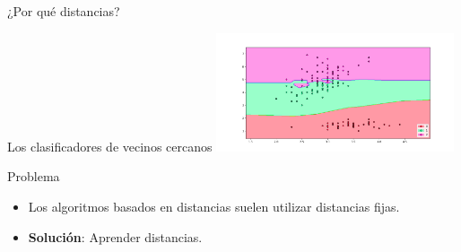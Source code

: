 \documentclass[10pt, compress]{beamer}
\begin{document}
\begin{frame}{¿Por qué distancias?}

  \begin{example}{Los clasificadores de vecinos cercanos}
    \centering\includegraphics[height=3.5cm]{./images/knn_example.png}
  \end{example}

  \begin{alertblock}{Problema}
    \begin{itemize}
      \item Los algoritmos basados en distancias suelen utilizar distancias fijas.
      \item \textbf{Solución}: Aprender distancias.
    \end{itemize}
  \end{alertblock}
\end{frame}
\end{document}
